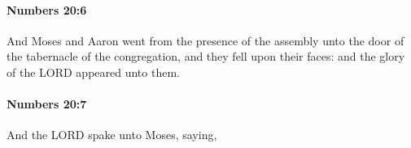 		\paragraph{Numbers 20:6} %
			\label{NUMBERS-20-6}

			And Moses and Aaron went from the presence of the assembly unto the door of the tabernacle of the congregation, and they fell upon their faces: and the glory of the LORD appeared unto them.


		\paragraph{Numbers 20:7} %
			\label{NUMBERS-20-7}

			And the LORD spake unto Moses, saying,


